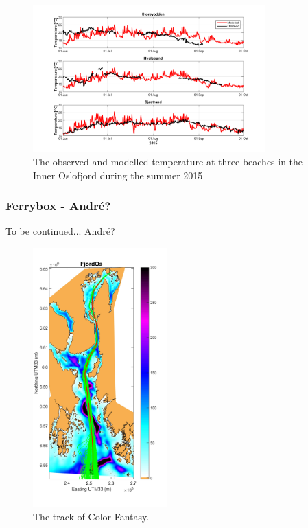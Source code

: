 \begin{figure}[ht]
\centerline{
\includegraphics*[trim=0 0 0 0,clip=true,width=0.8\textwidth]{Figurer/badetemp_2015}
}
\caption{\small
The observed and modelled temperature at three beaches in the Inner Oslofjord during the summer 2015}
\label{fig:badetemp_2015}
\end{figure}


\subsubsection{Ferrybox - Andr\'{e}?}
To be continued... Andr\'{e}?

\begin{figure}[ht]
\centerline{
\includegraphics*[trim=1cm 0cm 1cm 0cm,clip=true,height=10cm]{Figurer/FjordOs_with_FA_track}}
\caption{\small
The track of Color Fantasy.}
\label{fig:Ferrybox_track}
\end{figure}

